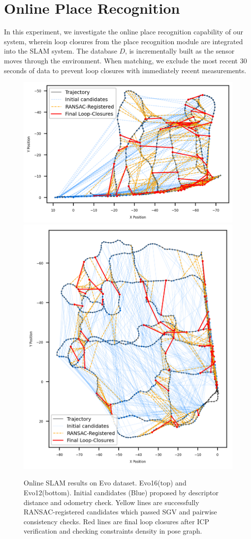 \section{Online Place Recognition}
\label{sec:exp_online_slam}
In this experiment, we investigate the online place recognition capability of our system, wherein loop closures from the place recognition module are integrated into the SLAM system. The database $D$, is incrementally built as the sensor moves through the environment. When matching, we exclude the most recent 30 seconds of data to prevent loop closures with immediately recent measurements.

\begin{figure}[htbp]
  \centering
  \includegraphics[width=0.8\columnwidth]{pics/exp_2_1_evo16_online.png}
  \includegraphics[width=0.8\columnwidth]{pics/exp_2_1_evo12_online.png}
  \caption{Online SLAM results on Evo dataset. Evo16(top) and Evo12(bottom). Initial candidates (Blue) proposed by descriptor distance and odometry check. Yellow lines are successfully RANSAC-registered candidates which passed SGV and pairwise consistency checks. Red lines are final loop closures after ICP verification and checking constraints density in pose graph.}
  \label{fig:exp_2_1_evo_online}
\end{figure}

